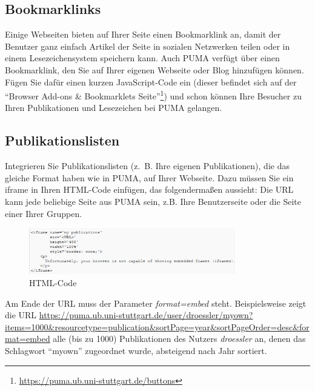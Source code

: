 \subsection{Bookmarklinks}
\label{subsec:bookmarklinks}
Einige Webseiten bieten  auf Ihrer Seite einen Bookmarklink an, damit der Benutzer ganz einfach Artikel der Seite in sozialen Netzwerken teilen oder in einem Lesezeichensystem speichern kann. 
\newline Auch PUMA verfügt über einen Bookmarklink, den Sie auf Ihrer eigenen Webseite oder Blog hinzufügen können. Fügen Sie dafür einen kurzen JavaScript-Code ein (dieser befindet sich auf der \enquote{Browser Add-ons \& Bookmarklets Seite}\footnote{\url{https://puma.ub.uni-stuttgart.de/buttons}}) und schon können Ihre Besucher zu Ihren Publikationen und Lesezeichen bei PUMA gelangen.

\subsection{Publikationslisten}
\label{subsec:publikationslisten}
Integrieren Sie Publikationslisten (z.~B. Ihre eigenen Publikationen), die das gleiche Format haben wie in PUMA, auf Ihrer Webseite. Dazu müssen Sie ein iframe in Ihren HTML-Code einfügen, das folgendermaßen aussieht:\newline %
Die URL kann jede beliebige Seite aus PUMA sein, z.B. Ihre Benutzerseite oder die Seite einer Ihrer Gruppen. 
\begin{figure}[h!]
 \centering
 \includegraphics[width=9cm]{Bilder/Kapitel9/HTML-Code.PNG}
 \caption{HTML-Code}
 \label{fig:htmlCode}
\end{figure}
\begin{mdframed}[style=mdfexample1,frametitle={WICHTIG},backgroundcolor=gray!40]Am Ende der URL muss der Parameter \textit{format=embed} steht. Beispielsweise zeigt die URL \url{https://puma.ub.uni-stuttgart.de/user/droessler/myown?items=1000&resourcetype=publication&sortPage=year&sortPageOrder=desc&format=embed}
 alle (bis zu 1000) Publikationen des Nutzers \textit{droessler} an, denen das Schlagwort \enquote{myown} zugeordnet wurde, absteigend nach Jahr sortiert.
\end{mdframed}
